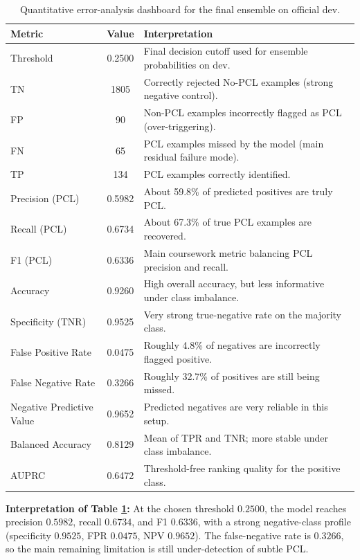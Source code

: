 \documentclass[11pt, a4paper]{article}
\begin{document}
\begin{table}[H]
  \centering
  \scriptsize
  \begin{tabularx}{\linewidth}{l c >{\raggedright\arraybackslash}X}
    \toprule
    Metric & Value & Interpretation \\
    \midrule
    Threshold & 0.2500 & Final decision cutoff used for ensemble probabilities on dev. \\
    TN & 1805 & Correctly rejected No-PCL examples (strong negative control). \\
    FP & 90 & Non-PCL examples incorrectly flagged as PCL (over-triggering). \\
    FN & 65 & PCL examples missed by the model (main residual failure mode). \\
    TP & 134 & PCL examples correctly identified. \\
    Precision (PCL) & 0.5982 & About 59.8\% of predicted positives are truly PCL. \\
    Recall (PCL) & 0.6734 & About 67.3\% of true PCL examples are recovered. \\
    F1 (PCL) & 0.6336 & Main coursework metric balancing PCL precision and recall. \\
    Accuracy & 0.9260 & High overall accuracy, but less informative under class imbalance. \\
    Specificity (TNR) & 0.9525 & Very strong true-negative rate on the majority class. \\
    False Positive Rate & 0.0475 & Roughly 4.8\% of negatives are incorrectly flagged positive. \\
    False Negative Rate & 0.3266 & Roughly 32.7\% of positives are still being missed. \\
    Negative Predictive Value & 0.9652 & Predicted negatives are very reliable in this setup. \\
    Balanced Accuracy & 0.8129 & Mean of TPR and TNR; more stable under class imbalance. \\
    AUPRC & 0.6472 & Threshold-free ranking quality for the positive class. \\
    \bottomrule
  \end{tabularx}
  \caption{Quantitative error-analysis dashboard for the final ensemble on official dev.}
  \label{tab:error_metric_dashboard_dev}
\end{table}

\textbf{Interpretation of Table \ref{tab:error_metric_dashboard_dev}:}
At the chosen threshold \(0.2500\), the model reaches precision \(0.5982\), recall \(0.6734\), and F1 \(0.6336\), with a strong negative-class profile (specificity \(0.9525\), FPR \(0.0475\), NPV \(0.9652\)). The false-negative rate is \(0.3266\), so the main remaining limitation is still under-detection of subtle PCL.
\end{document}
